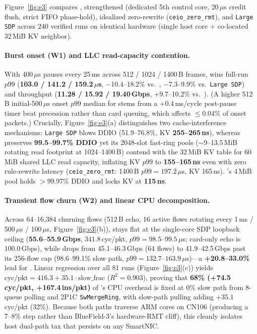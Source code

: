 Figure~\ref{fig:e3} compares \sys{}, strengthened \ceio{} (dedicated 5th control
core, 20\,$\mu$s credit flush, strict FIFO phase-hold), idealized zero-rewrite
\ceio{} (\texttt{ceio\_zero\_rmt}), and \texttt{Large SDP} across 240 verified
runs on identical hardware (single host core + co-located 32\,MiB KV neighbor).

\paragraph{Burst onset (W1) and LLC read-capacity contention.}
With 400\,$\mu$s pauses every 25\,ms across 512 / 1024 / 1400\,B frames, \sys{}
wins full-run $p99$ (\textbf{103.0 / 141.2 / 159.2\,$\mu$s}, $-$10.4--18.2\%
vs.\ \ceio{}, $-$7.3--9.9\% vs.\ \texttt{Large SDP}) and throughput
(\textbf{11.28 / 15.92 / 19.40\,Gbps}, +9.7--10.2\% vs.\ \ceio{}). (A higher
512\,B initial-500\,$\mu$s onset $p99$ median for \sys{} stems from a
+0.4\,ms/cycle post-pause timer beat precession rather than card queuing, which
affects $\le 0.04\%$ of onset packets.) Crucially, Figure~\ref{fig:e3}(a)
distinguishes two cache-interference mechanisms: \texttt{Large SDP} blows DDIO
(51.9--76.8\%, KV \textbf{255--265\,ns}), whereas \ceio{} preserves
\textbf{99.5--99.7\% DDIO} yet its 2048-slot fast-ring pools ($\sim$9--13.5\,MiB
rotating read footprint at 1024--1400\,B) contend with the 32\,MiB KV table for
60\,MiB shared LLC read capacity, inflating KV $p99$ to \textbf{155--165\,ns}
even with zero rule-rewrite latency (\texttt{ceio\_zero\_rmt}: 1400\,B
$p99=197.2\,\mu$s, KV 165\,ns). \sys{}'s 4\,MiB pool holds $>$99.97\% DDIO and
locks KV at \textbf{115\,ns}.

\paragraph{Transient flow churn (W2) and linear CPU decomposition.}
Across 64--16,384 churning flows (512\,B echo, 16 active flows rotating every
1\,ms / 500\,$\mu$s / 100\,$\mu$s, Figure~\ref{fig:e3}(b)), \sys{} stays flat
at the single-core SDP loopback ceiling (\textbf{55.6--55.9\,Gbps},
341.8\,cyc/pkt, $p99=98.5$--$99.5\,\mu$s; card-only echo is 100.0\,Gbps), while
\ceio{} drops from 45.1--46.3\,Gbps (64 flows) to 41.9--42.5\,Gbps past its
256-flow cap (98.6--99.1\% slow path, $p99=132.7$--$163.9\,\mu$s)---a
\textbf{+20.8--33.0\%} lead for \sys{}. Linear regression over all 81 \ceio{}
runs (Figure~\ref{fig:e3}(c)) yields
$\text{cyc/pkt} = 416.3 + 35.1 \cdot \text{slow\_frac}$ ($R^2 = 0.903$),
proving that \textbf{68\% (+74.5\,cyc/pkt, +167.4\,ins/pkt)} of \ceio{}'s CPU
overhead is fixed at 0\% slow path from 8-queue polling and 2P1C
\texttt{SwMergeRing}, with slow-path pulling adding +35.1\,cyc/pkt (32\%).
Because both \ceio{} paths traverse ARM cores on CN106 (producing a 7--8\% step
rather than BlueField-3's hardware-RMT cliff), this cleanly isolates host
dual-path tax that persists on any SmartNIC.

